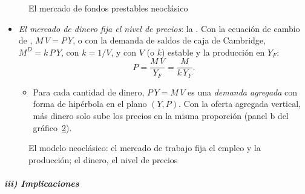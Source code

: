 \documentclass[11pt]{article}
\begin{document}
\begin{figure}[H]
\centering
\caption{El mercado de fondos prestables neoclásico}\label{fig:fondos-prestables}
\end{figure}

\begin{itemize}
\item \emph{El mercado de dinero fija el nivel de precios}: la  . Con la ecuación de cambio de \textcite{Fisher1911Purchasing}, $M\,V=P\,Y$, o con la demanda de saldos de caja de Cambridge, $M^D=k\,P\,Y$\nocite{Pigou1917Value}, con $k=1/V$, y con $V$ (o $k$) estable y la producción en $Y_F$:
  \begin{equation}
  P=\frac{M\,V}{Y_F}=\frac{M}{k\,Y_F}. \label{eq:cuantitativa-clasica}
  \end{equation}
  \begin{itemize}
  \item Para cada cantidad de dinero, $P\,Y=M\,V$ es una \emph{demanda agregada} con forma de hipérbola en el plano $(Y,P)$. Con la oferta agregada vertical, más dinero solo sube los precios en la misma proporción (panel b del gráfico~\ref{fig:modelo-neoclasico}).
  \end{itemize}
\end{itemize}

\begin{figure}[H]
\centering
\caption{El modelo neoclásico: el mercado de trabajo fija el empleo y la producción; el dinero, el nivel de precios}\label{fig:modelo-neoclasico}
\end{figure}

\subparagraph{iii) Implicaciones}
\end{document}
